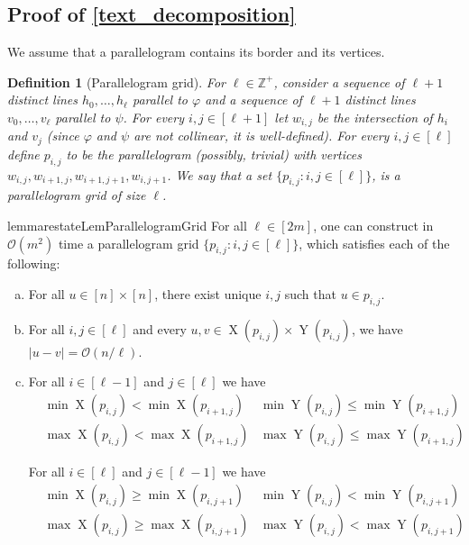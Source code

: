 \documentclass[twoside,leqno]{article}
\newtheorem{definition}{Definition}[section]
\newcommand{\Z}{\mathbb{Z}}
\renewcommand{\O}{\mathcal{O}}
\renewcommand{\phi}{\varphi}
\newcommand{\eq}[1]{\begin{align*} #1 \end{align*}}
\DeclareMathOperator*{\X}{X}
\DeclareMathOperator*{\Y}{Y}
\newcommand{\absolute}[1]{\left\lvert#1\right\rvert}
\begin{document}
\restateThmTextDecomposition


\subsection{Proof of \cref{text_decomposition}}
We assume that a parallelogram contains its border and its vertices.

\begin{definition}[Parallelogram grid]
	For $\ell \in \Z^+$, consider a sequence of $\ell+1$  distinct lines $h_0, \dots, h_\ell$ parallel to $\phi$ and a sequence of $\ell+1$ distinct lines $v_0, \dots, v_\ell$ parallel to $\psi$.
	For every $i, j \in [\ell + 1]$ let $w_{i, j}$ be the intersection of $h_i$ and $v_j$ (since $\phi$ and $\psi$ are not collinear, it is well-defined).
	For every $i, j \in [\ell]$ define $p_{i, j}$ to be the parallelogram (possibly, trivial) with vertices $w_{i, j}, w_{i + 1, j}, w_{i + 1, j + 1}, w_{i, j + 1}$. We say that a set $\{p_{i,j} : i,j \in [\ell]\}$, is a \emph{parallelogram grid} of size $\ell$. 
\end{definition}

\begin{restatable}{lemma}{restateLemParallelogramGrid}\label{lm:parallelogram_grid}
For all $\ell \in [2m]$, one can construct in $\O(m^2)$ time a parallelogram grid $\{p_{i,j} : i,j \in [\ell]\}$, which satisfies each of the following:
\begin{enumerate}[(a)]
\item \label{it:unique} For all $u \in [n] \times [n]$, there exist unique $i,j$ such that $u \in p_{i,j}$.

\item \label{it:small_parallelogram} For all $i, j \in [\ell]$ and every $u, v \in \X(p_{i, j}) \times \Y(p_{i, j})$, we have $\absolute{u - v} = \O(n / \ell)$.

\item \label{it:monotonicity} For all $i \in [\ell - 1]$ and $j \in [\ell]$ we have
	\eq{
	&\min \X(p_{i, j}) < \min \X(p_{i + 1, j}) &\min \Y(p_{i, j}) \le \min \Y(p_{i + 1, j}) \\
	&\max \X(p_{i, j}) < \max \X(p_{i + 1, j})  &\max \Y(p_{i, j}) \le \max \Y(p_{i + 1, j})
	}
	
For all $i \in [\ell]$ and $j \in [\ell - 1]$ we have
	\eq{
		&\min \X(p_{i, j}) \ge \min \X(p_{i, j + 1})  &\min \Y(p_{i, j}) < \min \Y(p_{i, j + 1}) \\
		&\max \X(p_{i, j}) \ge \max \X(p_{i, j + 1})  &\max \Y(p_{i, j}) < \max \Y(p_{i, j + 1})
	}
\end{enumerate}
\end{restatable}
\end{document}
